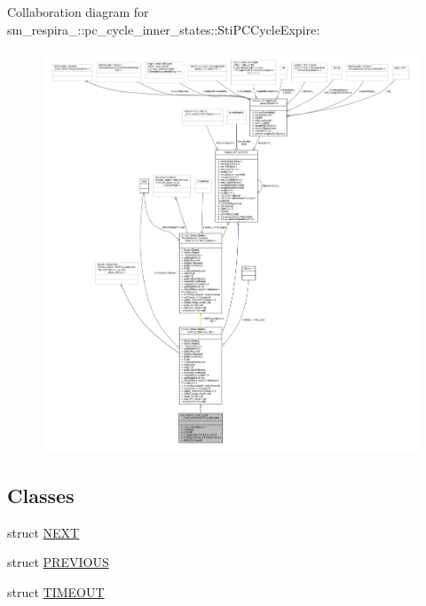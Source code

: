 Collaboration diagram for sm\+\_\+respira\+\_\+:\+:pc\+\_\+cycle\+\_\+inner\+\_\+states\+:\+:Sti\+P\+C\+Cycle\+Expire\+:
\nopagebreak
\begin{figure}[H]
\begin{center}
\leavevmode
\includegraphics[width=350pt]{structsm__respira__1_1_1pc__cycle__inner__states_1_1StiPCCycleExpire__coll__graph}
\end{center}
\end{figure}
\subsection*{Classes}
\begin{DoxyCompactItemize}
\item 
struct \hyperlink{structsm__respira__1_1_1pc__cycle__inner__states_1_1StiPCCycleExpire_1_1NEXT}{N\+E\+XT}
\item 
struct \hyperlink{structsm__respira__1_1_1pc__cycle__inner__states_1_1StiPCCycleExpire_1_1PREVIOUS}{P\+R\+E\+V\+I\+O\+US}
\item 
struct \hyperlink{structsm__respira__1_1_1pc__cycle__inner__states_1_1StiPCCycleExpire_1_1TIMEOUT}{T\+I\+M\+E\+O\+UT}
\end{DoxyCompactItemize}
